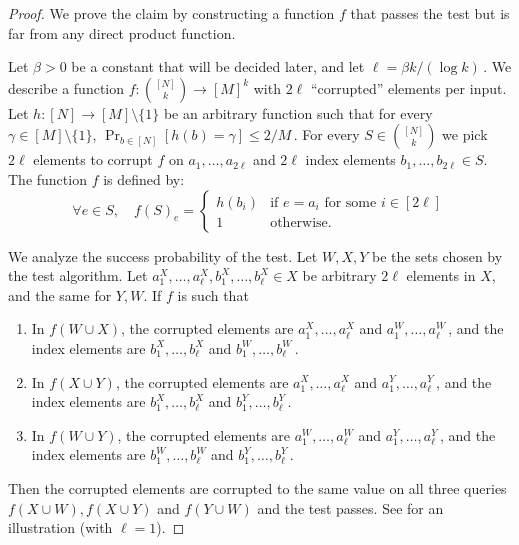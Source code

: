 \documentclass[11pt]{article}
\numberwithin{equation}{section}
\theoremstyle{definition}
\theoremstyle{plain}
\newcommand\f{f} %
\newcommand\h{h} %
\newcommand{\sets}{\binom{[N]}{k}} %
\begin{document}
\begin{proof}
	We prove the claim by constructing a function $\f$ that passes the test but is far from any direct product function. 
	
	Let $\beta > 0$ be a constant that will be decided later, and let 
$\ell = {\beta k}/{(\log k)}$\,. %
 We describe a function $\f:\binom{[N]}{k}\rightarrow [M]^k$ with $2\ell$ ``corrupted'' elements per input.
	Let $\h:[N]\rightarrow[M]\setminus \{1\}$ be an arbitrary function such that for every $\gamma\in [M]\setminus  \{1\}$, $\Pr_{b\in[N]}[h(b)=\gamma]\leq
	2/M$\,. %
	For every $S\in \sets$ we pick $2\ell$ elements to corrupt $\f$ on $a_1,\ldots, a_{2\ell}$ and $2\ell$ index elements $b_1,\ldots,b_{2\ell}\in S$. The function $\f$ is defined by:
		\[  \forall e\in S, \quad f(S)_e = \begin{cases}
	h(b_i) & \text{if }e=a_i \text{ for some } i\in[2\ell]\\
	1 & \text{otherwise.} 
	\end{cases}  \]

	We %
analyze  %
%
the success probability of the test.  %
Let $W,X,Y$ be the sets chosen by the test algorithm. Let $a^X_1,\ldots, a^X_\ell,b^X_1,\ldots, b^X_\ell\in X$ be arbitrary $2\ell$ elements in $X$, and the same for $Y,W$.
	If $\f$ is such that
	\begin{enumerate}
	    \item In $\f(W\cup X)$, the corrupted elements are  $a_1^X,\ldots, a^X_\ell$ and $a^W_1,\ldots, a^W_\ell$\,, and the index elements are $b_1^X,\ldots, b_\ell^X$ and $b_1^W,\ldots, b_\ell^W$\,.
	    \item In $\f(X\cup Y)$, the corrupted elements are  $a_1^X,\ldots, a^X_\ell$ and $a^Y_1,\ldots, a^Y_\ell$\,, and the index elements are $b_1^X,\ldots, b_\ell^X$ and $b_1^Y,\ldots, b_\ell^Y$\,.
	    \item  In $f(W\cup Y)$, the corrupted elements are  $a^W_1,\ldots, a^W_\ell$ and $a^Y_1,\ldots, a^Y_\ell$\,, and the index elements are $b_1^W,\ldots, b_\ell^W$ and $b_1^Y,\ldots, b_\ell^Y$\,.
	\end{enumerate} 
	Then the corrupted elements are corrupted to the same value on all three queries $\f(X\cup W), \f(X\cup Y)$ and $\f(Y\cup W)$ and the test passes. See  for an illustration (with $\ell=1$).
	

\end{proof}
\end{document}
